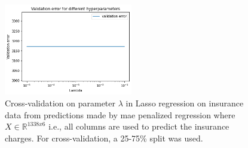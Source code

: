 \documentclass[10pt]{article}
\begin{document}
\begin{figure}[!ht]
  \centering
  \includegraphics[width=0.5\textwidth]{doc/images/cross_val_insurance.png}
  \caption{Cross-validation on parameter $\lambda$ in Lasso regression on insurance data from predictions made by mae penalized regression where $X\in\mathbb{R}^{1338x6}$ i.e., all columns are used to predict the insurance charges. For cross-validation, a 25-75\% split was used.}
  \vspace{-3mm}
  \label{fig:cross-val-insurance}
\end{figure}
\end{document}
